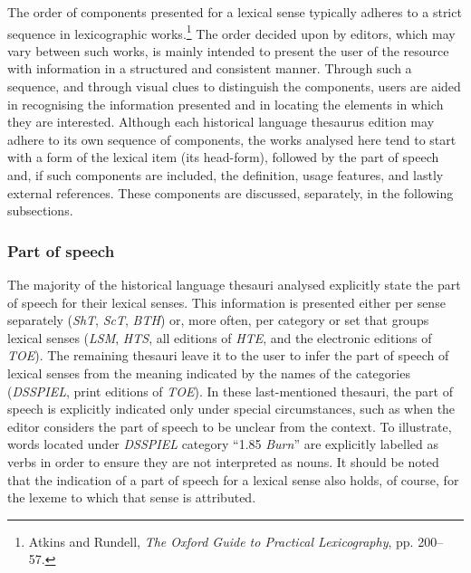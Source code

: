 The order of components presented for a lexical sense typically adheres to a strict sequence in lexicographic works.\footnote{Atkins and Rundell, \textit{The Oxford Guide to Practical Lexicography}, pp. 200–57.} The order decided upon by editors, which may vary between such works, is mainly intended to present the user of the resource with information in a structured and consistent manner. Through such a sequence, and through visual clues to distinguish the components, users are aided in recognising the information presented and in locating the elements in which they are interested. %
Although each historical language thesaurus edition may adhere to its own sequence of components, the works analysed here tend to start with a form of the lexical item (its head-form), followed by the part of speech and, if such components are included, the definition, usage features, and lastly external references. 
These components are discussed, separately, in the following subsections.


\subsubsection{Part of speech}
The majority of the historical language thesauri analysed explicitly state the part of speech for their lexical senses. This information is presented either per sense separately (\textit{ShT}, \textit{ScT}, \textit{BTH}) or, more often, per category or set that groups lexical senses (\textit{LSM}, \textit{HTS}, all editions of \textit{HTE}, and the electronic editions of \textit{TOE}). The remaining thesauri leave it to the user to infer the part of speech of lexical senses from the meaning indicated by the names of the categories (\textit{DSSPIEL}, print editions of \textit{TOE}). In these last-mentioned thesauri, the part of speech is explicitly indicated only under special circumstances, such as when the editor considers the part of speech to be unclear from the context. To illustrate, words located under \textit{DSSPIEL} category ``1.85 \textit{Burn}'' are explicitly labelled as verbs in order to ensure they are not interpreted as nouns. It should be noted that the indication of a part of speech for a lexical sense also holds, of course, for the lexeme to which that sense is attributed. 

